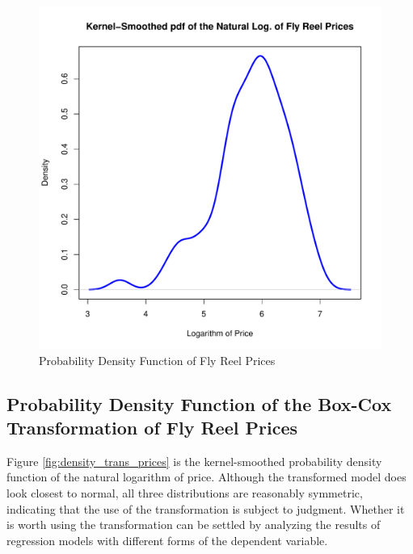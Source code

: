 \begin{figure}[h!]
  \centering
  \includegraphics[scale = 0.5, keepaspectratio=true]{../Figures/density_log_prices}
  \caption{Probability Density Function of Fly Reel Prices} \label{fig:density_log_prices}
\end{figure}



\pagebreak
\subsection{Probability Density Function of the Box-Cox Transformation of Fly Reel Prices}

Figure \ref{fig:density_trans_prices} is the kernel-smoothed probability density function of the natural logarithm of
price. 
Although the transformed model does look closest to normal,
all three distributions are reasonably symmetric, 
indicating that the use of the transformation is subject to judgment.
Whether it is worth using the transformation
can be settled by analyzing the results of regression models 
with different forms of the dependent variable. 

